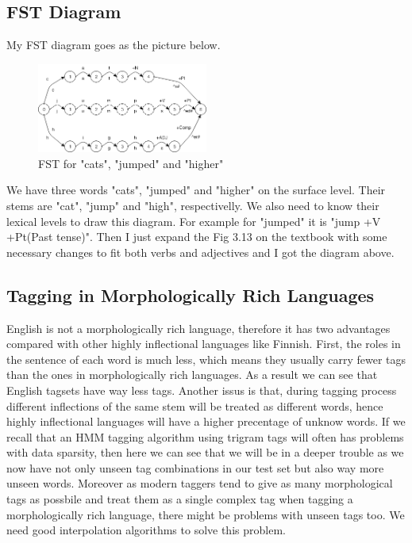 \documentclass[11pt]{article} %
\begin{document}
\subsection{FST Diagram}

My FST diagram goes as the picture below.

\begin{figure}[h]
  \centering
  \includegraphics[width=0.5\textwidth]{images/figure_fst.png}
  \caption{FST for "cats", "jumped" and "higher"}
\end{figure}

We have three words "cats", "jumped" and "higher" on the surface level. Their stems are "cat", "jump" and "high", respectivelly. We also need to know their lexical levels to draw this diagram. For example for "jumped" it is "jump +V +Pt(Past tense)". Then I just expand the Fig 3.13 on the textbook\cite[61]{JurafskyMartin200805} with some necessary changes to fit both verbs and adjectives and I got the diagram above.

\subsection{Tagging in Morphologically Rich Languages}

English is not a morphologically rich language, therefore it has two advantages compared with other highly inflectional languages like Finnish. First, the roles in the sentence of each word is much less, which means they usually carry fewer tags than the ones in morphologically rich languages. As a result we can see that English tagsets have way less tags\cite[162]{JurafskyMartin200805}. Another issus is that, during tagging process different inflections of the same stem will be treated as different words, hence highly inflectional languages will have a higher precentage of unknow words. If we recall that an HMM tagging algorithm using trigram tags will often has problems with data sparsity\cite[149]{JurafskyMartin200805}, then here we can see that we will be in a deeper trouble as we now have not only unseen tag combinations in our test set but also way more unseen words. Moreover as modern taggers tend to give as many morphological tags as possbile and treat them as a single complex tag when tagging a morphologically rich language, there might be problems with unseen tags too. We need good interpolation algorithms to solve this problem.

\printbibliography
\end{document}
